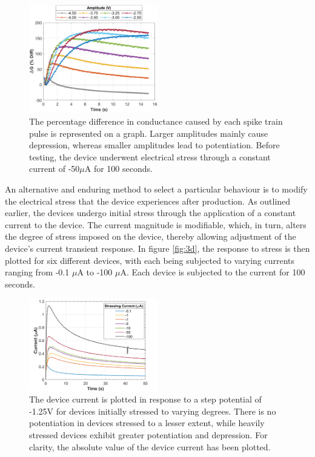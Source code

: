\begin{figure}[htbp!] 
\centering    
\includegraphics[width=0.5\textwidth]{Chapter3/Figs/3i.png}
\caption[Depression selection using spike trains of greater amplitudes.]{The percentage difference in conductance caused by each spike train pulse is represented on a graph. Larger amplitudes mainly cause depression, whereas smaller amplitudes lead to potentiation. Before testing, the device underwent electrical stress through a constant current of -50$\mu$A for 100 seconds.}
\label{fig:3i}
\end{figure}

\noindent An alternative and enduring method to select a particular behaviour is to modify the electrical stress that the device experiences after production. As outlined earlier, the devices undergo initial stress through the application of a constant current to the device. The current magnitude is modifiable, which, in turn, alters the degree of stress imposed on the device, thereby allowing adjustment of the device's current transient response. In figure \ref{fig:3d}, the response to stress is then plotted for six different devices, with each being subjected to varying currents ranging from -0.1 $\mu$A to -100 $\mu$A. Each device is subjected to the current for 100 seconds.\\

\begin{figure}[htbp!] 
\centering    
\includegraphics[width=0.5\textwidth]{Chapter3/Figs/3j.png}
\caption[Device current dependence on stressing magnitudes.]{The device current is plotted in response to a step potential of -1.25V for devices initially stressed to varying degrees. There is no potentiation in devices stressed to a lesser extent, while heavily stressed devices exhibit greater potentiation and depression. For clarity, the absolute value of the device current has been plotted.}
\label{fig:3j}
\end{figure}

